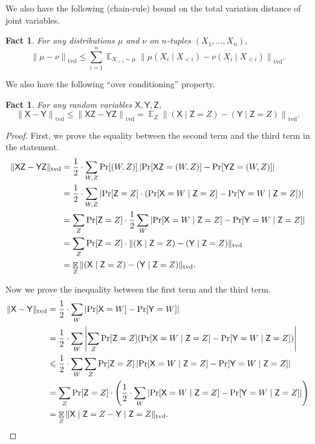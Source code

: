 \documentclass[11pt]{article}
\newtheorem{fact}[lemma]{Fact}
\theoremstyle{definition}
\renewcommand{\leq}{\leqslant}
\newcommand{\tvd}[2]{\ensuremath{\norm{#1 - #2}_{\mathrm{tvd}}}}
\newcommand{\paren}[1]{\ensuremath{\left(#1\right)}\xspace}
\newcommand{\card}[1]{\left\vert{#1}\right\vert}
\newcommand{\norm}[1]{\ensuremath{\|#1\|}}
\DeclareMathOperator*{\Exp}{\ensuremath{{\mathbb{E}}}}
\DeclareMathOperator*{\Prob}{\ensuremath{\textnormal{Pr}}}
\renewcommand{\Pr}{\Prob}
\newcommand{\rv}[1]{\ensuremath{{\mathsf{#1}}}\xspace}
\newcommand{\rX}{\rv{X}}
\newcommand{\rY}{\rv{Y}}
\newcommand{\rZ}{\rv{Z}}
\begin{document}



We also have the following (chain-rule) bound on the total variation distance of joint variables.

\begin{fact}\label{fact:tvd-chain-rule}
	For any distributions $\mu$ and $\nu$ on $n$-tuples $(X_1,\ldots,X_n)$, 
	\[
		\tvd{\mu}{\nu} \leq \sum_{i=1}^{n} \Exp_{X_{<i} \sim \mu} \tvd{\mu(X_i \mid X_{<i})}{\nu(X_i \mid X_{<i})}. 
	\]
\end{fact}

We also have the following ``over conditioning'' property. 

\begin{fact}\label{fact:tvd-over-conditioning}
	For any random variables $\rX,\rY,\rZ$, 
	\[
		\tvd{\rX}{\rY} \leq \tvd{\rX\rZ}{\rY\rZ} = \Exp_{Z} \tvd{(\rX \mid \rZ=Z)}{(\rY \mid \rZ=Z)}.  
	\]
\end{fact}
\begin{proof}
First, we prove the equality between the second term and the third term in the statement. 
\begin{align*}
	\tvd{\rX\rZ}{\rY\rZ} &=\frac12 \cdot \sum_{W, Z} \Pr[(W, Z)] \card{\Pr[\rX\rZ = (W, Z)] - \Pr[\rY\rZ=(W, Z)]}  \\
	&=\frac12 \cdot \sum_{W, Z}  \card{\Pr[\rZ = Z] \cdot (\Pr[\rX = W \mid  \rZ = Z] - \Pr[\rY = W \mid \rZ= Z])} \\
	&= \sum_{Z} \Pr[\rZ =Z] \cdot \frac12 \sum_{W}  \card{\Pr[\rX = W \mid  \rZ = Z] - \Pr[\rY = W \mid \rZ= Z]} \\
	&= \sum_{Z} \Pr[\rZ =Z] \cdot\tvd{(\rX \mid \rZ= Z)}{(\rY \mid \rZ = Z)} \\
	&= \Exp_{Z} \tvd{(\rX \mid \rZ= Z)}{(\rY \mid \rZ = Z)}.
\end{align*}

Now we prove the inequality between the first term and the third term. 
\begin{align*}
		\tvd{\rX}{\rY} &= \frac12 \cdot \sum_{W} \card{\Pr[\rX = W] - \Pr[\rY = W]} \\
		&= \frac12 \cdot \sum_{W} \card{\sum_{Z} \Pr[\rZ = Z](\Pr[\rX = W \mid \rZ = Z] - \Pr[\rY = W \mid \rZ = Z])} \\
		& \leq  \frac12 \cdot \sum_{W}  \sum_{Z} \Pr[\rZ = Z] \card{\Pr[\rX = W \mid \rZ = Z] - \Pr[\rY = W \mid \rZ = Z]} \\
		&= \sum_{Z}   \Pr[\rZ = Z] \cdot \paren{\frac12 \cdot \sum_{W} \card{\Pr[\rX = W \mid \rZ = Z] - \Pr[\rY = W \mid \rZ = Z]}}  \\
		&= \Exp_{Z} \tvd{\rX \mid \rZ= Z}{\rY \mid \rZ = Z}. \qedhere
\end{align*}
\end{proof}
\end{document}

